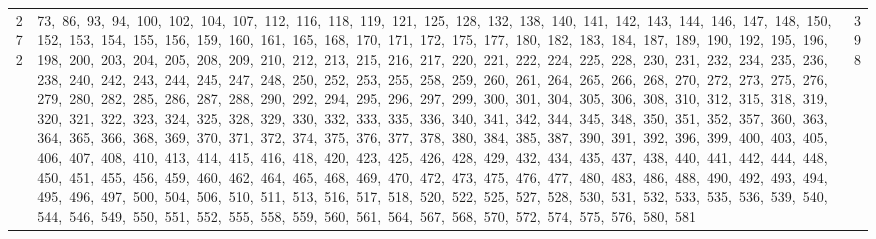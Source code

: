 \begin{longtable}{c|p{}|r}
272 & 73,\ 86,\ 93,\ 94,\ 100,\ 102,\ 104,\ 107,\ 112,\ 116,\ 118,\ 119,\ 121,\ 125,\ 128,\ 132,\ 138,\ 140,\ 141,\ 142,\ 143,\ 144,\ 146,\ 147,\ 148,\ 150,\ 152,\ 153,\ 154,\ 155,\ 156,\ 159,\ 160,\ 161,\ 165,\ 168,\ 170,\ 171,\ 172,\ 175,\ 177,\ 180,\ 182,\ 183,\ 184,\ 187,\ 189,\ 190,\ 192,\ 195,\ 196,\ 198,\ 200,\ 203,\ 204,\ 205,\ 208,\ 209,\ 210,\ 212,\ 213,\ 215,\ 216,\ 217,\ 220,\ 221,\ 222,\ 224,\ 225,\ 228,\ 230,\ 231,\ 232,\ 234,\ 235,\ 236,\ 238,\ 240,\ 242,\ 243,\ 244,\ 245,\ 247,\ 248,\ 250,\ 252,\ 253,\ 255,\ 258,\ 259,\ 260,\ 261,\ 264,\ 265,\ 266,\ 268,\ 270,\ 272,\ 273,\ 275,\ 276,\ 279,\ 280,\ 282,\ 285,\ 286,\ 287,\ 288,\ 290,\ 292,\ 294,\ 295,\ 296,\ 297,\ 299,\ 300,\ 301,\ 304,\ 305,\ 306,\ 308,\ 310,\ 312,\ 315,\ 318,\ 319,\ 320,\ 321,\ 322,\ 323,\ 324,\ 325,\ 328,\ 329,\ 330,\ 332,\ 333,\ 335,\ 336,\ 340,\ 341,\ 342,\ 344,\ 345,\ 348,\ 350,\ 351,\ 352,\ 357,\ 360,\ 363,\ 364,\ 365,\ 366,\ 368,\ 369,\ 370,\ 371,\ 372,\ 374,\ 375,\ 376,\ 377,\ 378,\ 380,\ 384,\ 385,\ 387,\ 390,\ 391,\ 392,\ 396,\ 399,\ 400,\ 403,\ 405,\ 406,\ 407,\ 408,\ 410,\ 413,\ 414,\ 415,\ 416,\ 418,\ 420,\ 423,\ 425,\ 426,\ 428,\ 429,\ 432,\ 434,\ 435,\ 437,\ 438,\ 440,\ 441,\ 442,\ 444,\ 448,\ 450,\ 451,\ 455,\ 456,\ 459,\ 460,\ 462,\ 464,\ 465,\ 468,\ 469,\ 470,\ 472,\ 473,\ 475,\ 476,\ 477,\ 480,\ 483,\ 486,\ 488,\ 490,\ 492,\ 493,\ 494,\ 495,\ 496,\ 497,\ 500,\ 504,\ 506,\ 510,\ 511,\ 513,\ 516,\ 517,\ 518,\ 520,\ 522,\ 525,\ 527,\ 528,\ 530,\ 531,\ 532,\ 533,\ 535,\ 536,\ 539,\ 540,\ 544,\ 546,\ 549,\ 550,\ 551,\ 552,\ 555,\ 558,\ 559,\ 560,\ 561,\ 564,\ 567,\ 568,\ 570,\ 572,\ 574,\ 575,\ 576,\ 580,\ 581 & 398 \\

\end{longtable}
